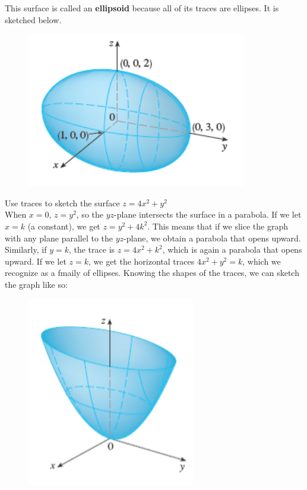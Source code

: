         This surface is called an \textbf{ellipsoid} because all of its traces are ellipses. It is sketched below.

        \begin{figure}[hbt!]
            \centering
            \includegraphics[]{Resources/12.6_Ellipsoid}
        \end{figure}

        \textit{} Use traces to sketch the surface $z = 4x^2 + y^2$ \\

        When $x = 0$, $z = y^2$, so the $yz$-plane intersects the surface in a parabola. If we let $x=k$ (a constant), we get $z = y^2 + 4k^2$. This means that if we slice the graph with any plane parallel to the
        $yz$-plane, we obtain a parabola that opens upward. Similarly, if $y=k$, the trace is $z = 4x^2 + k^2$, which is again a parabola that opens upward. If we let $z=k$, we get the horizontal traces
        $4x^2 + y^2 = k$, which we recognize as a fmaily of ellipses. Knowing the shapes of the traces, we can sketch the graph like so:

        \begin{figure}[hbt!]
            \centering
            \includegraphics[]{Resources/12.6_Elliptic_Paraboloid}
        \end{figure}

